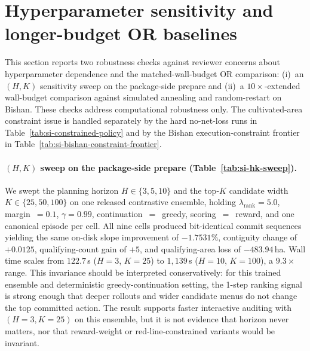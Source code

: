 \documentclass[11pt]{article}
\begin{document}
\section{Hyperparameter sensitivity and longer-budget OR baselines}\label{si:hyperparameter-sensitivity}

This section reports two robustness checks against reviewer concerns about hyperparameter dependence and the matched-wall-budget OR comparison: (i)~an $(H, K)$ sensitivity sweep on the package-side prepare and (ii)~a $10\times$-extended wall-budget comparison against simulated annealing and random-restart on Bishan. These checks address computational robustness only. The cultivated-area constraint issue is handled separately by the hard no-net-loss runs in Table~\ref{tab:si-constrained-policy} and by the Bishan execution-constraint frontier in Table~\ref{tab:si-bishan-constraint-frontier}.

\paragraph{$(H, K)$ sweep on the package-side prepare (Table~\ref{tab:si-hk-sweep}).} We swept the planning horizon $H \in \{3, 5, 10\}$ and the top-$K$ candidate width $K \in \{25, 50, 100\}$ on one released contrastive ensemble, holding $\lambda_{\text{rank}}=5.0$, margin~$=0.1$, $\gamma=0.99$, continuation~$=$~greedy, scoring~$=$~reward, and one canonical episode per cell. All nine cells produced bit-identical commit sequences yielding the same on-disk slope improvement of $-1.7531\%$, contiguity change of $+0.0125$, qualifying-count gain of $+5$, and qualifying-area loss of $-483.94$\,ha. Wall time scales from $122.7$\,s ($H{=}3$, $K{=}25$) to $1{,}139$\,s ($H{=}10$, $K{=}100$), a $9.3\times$ range. This invariance should be interpreted conservatively: for this trained ensemble and deterministic greedy-continuation setting, the 1-step ranking signal is strong enough that deeper rollouts and wider candidate menus do not change the top committed action. The result supports faster interactive auditing with $(H{=}3, K{=}25)$ on this ensemble, but it is not evidence that horizon never matters, nor that reward-weight or red-line-constrained variants would be invariant.
\end{document}
